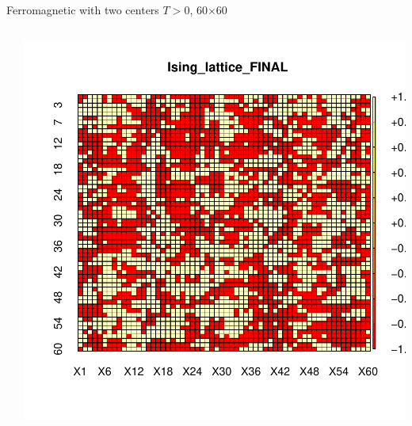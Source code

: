 \documentclass{beamer}
\begin{document}
\begin{frame}{Ferromagnetic with two centers $T>0$,  60$\times$60}
\begin{columns}
\begin{column}{0.3\textwidth}
\begin{center}
     \end{center}
\end{column}
\begin{column}{0.3\textwidth}
    \begin{center}
     \includegraphics[width=\textwidth]{Pic/J+1_60_10000_T=4_FINAL.pdf}
     \end{center}
 

\end{column}
\end{columns}
\end{frame}
\end{document}

